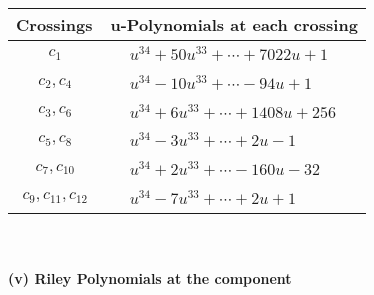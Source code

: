 \documentclass[1p]{elsarticle_modified}
\theoremstyle{definition}
\begin{document}
\begin{tabular}{m{50pt}|m{274pt}}
Crossings & \hspace{64pt}u-Polynomials at each crossing \\
\hline $$\begin{aligned}c_{1}\end{aligned}$$&$\begin{aligned}
&u^{34}+50 u^{33}+\cdots+7022 u+1
\end{aligned}$\\
\hline $$\begin{aligned}c_{2},c_{4}\end{aligned}$$&$\begin{aligned}
&u^{34}-10 u^{33}+\cdots-94 u+1
\end{aligned}$\\
\hline $$\begin{aligned}c_{3},c_{6}\end{aligned}$$&$\begin{aligned}
&u^{34}+6 u^{33}+\cdots+1408 u+256
\end{aligned}$\\
\hline $$\begin{aligned}c_{5},c_{8}\end{aligned}$$&$\begin{aligned}
&u^{34}-3 u^{33}+\cdots+2 u-1
\end{aligned}$\\
\hline $$\begin{aligned}c_{7},c_{10}\end{aligned}$$&$\begin{aligned}
&u^{34}+2 u^{33}+\cdots-160 u-32
\end{aligned}$\\
\hline $$\begin{aligned}c_{9},c_{11},c_{12}\end{aligned}$$&$\begin{aligned}
&u^{34}-7 u^{33}+\cdots+2 u+1
\end{aligned}$\\
\hline
\end{tabular}\\~\\
\newpage\renewcommand{\arraystretch}{1}
\flushleft \textbf{(v) Riley Polynomials at the component}\newline \\
\end{document}
